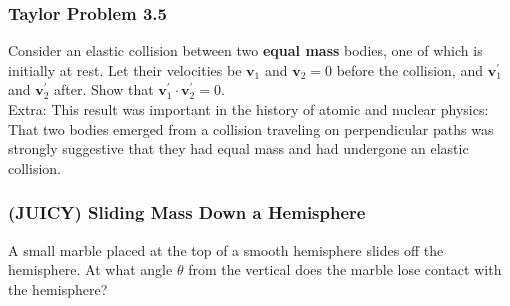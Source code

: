 \documentclass{article}
\begin{document}
\subsubsection{Taylor Problem 3.5}
Consider an elastic collision between two \textbf{equal mass} bodies, one of which is initially at rest. Let their velocities be $\mathbf{v}_1$ and $\mathbf{v}_2=0$ before the collision, and $\mathbf{v}_1^{\prime}$ and $\mathbf{v}_2^{\prime}$ after. Show that $\mathbf{v}_1^{\prime} \cdot \mathbf{v}_2^{\prime}=0$. \\[10pt]
Extra: This result was important in the history of atomic and nuclear physics: That two bodies emerged from a collision traveling on perpendicular paths was strongly suggestive that they had equal mass and had undergone an elastic collision.
\subsubsection{(JUICY) Sliding Mass Down a Hemisphere}
A small marble placed at the top of a smooth hemisphere slides off the hemisphere. At what angle $\theta$ from the vertical does the marble lose contact with the hemisphere?
\end{document}
